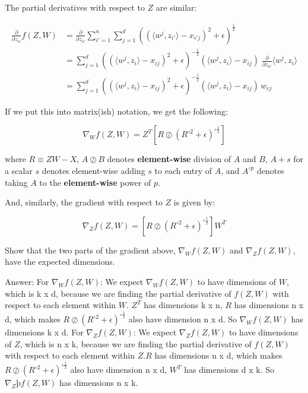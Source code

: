 \documentclass{article}
\newcommand{\blu}[1]{{\textcolor{blu}{#1}}}
\newcommand{\gre}[1]{\textcolor{gre}{#1}}
\newcommand\ans[1]{\par\gre{Answer: #1}}
\let\ask\blu
\begin{document}
The partial derivatives with respect to $Z$ are similar:

\begin{align*}
\frac{\partial}{\partial z_{ic}} f(Z,W)
  &= \frac{\partial}{\partial z_{ic}} \sum_{i'=1}^n \sum_{j=1}^d  \left( (\langle w^j, z_{i'}\rangle - x_{i'j})^2 + \epsilon \right)^{\frac12}\\
  &= \sum_{j=1}^d  \left( (\langle w^j, z_{i}\rangle - x_{ij})^2 + \epsilon \right)^{-\frac12}   (\langle w^j, z_{i}\rangle - x_{ij}) \; \frac{\partial}{\partial z_{ic}} \langle w^j, z_i\rangle \\
  &= \sum_{j=1}^d  \left( (\langle w^j, z_i\rangle - x_{ij})^2 + \epsilon \right)^{-\frac12}  (\langle w^j, z_i\rangle - x_{ij}) \, w_{cj}
\end{align*}

If we put this into matrix(ish) notation, we get the following:

\[
\nabla_W f(Z,W) = Z^T \left[ R \oslash \left(R^{\circ 2} + \epsilon\right)^{\circ \frac12}  \right]
\]

where $R\equiv ZW-X$,
$A \oslash B$ denotes \textbf{element-wise} division of $A$ and $B$,
$A + s$ for a scalar $s$ denotes element-wise adding $s$ to each entry of $A$,
and $A^{\circ p}$ denotes taking $A$ to the \textbf{element-wise} power of $p$.

And, similarly, the gradient with respect to $Z$ is given by:

\[
\nabla_Z f(Z,W) = \left[ R \oslash \left(R^{\circ 2} + \epsilon\right)^{\circ \frac12} \right] W^T
\]

\ask{Show that the two parts of the gradient above, $\nabla_W f(Z,W)$ and $\nabla_Z f(Z,W)$, have the expected dimensions.}

\ans{\newline\newline
For $\nabla_W f(Z,W)$:\newline\newline
We expect $\nabla_W f(Z,W)$ to have dimensions of $W$, which is k x d, because we are finding the partial derivative of $f(Z,W)$ with respect to each element within $W$. $Z^T$ has dimensions k x n, $R$ has dimensions n x d, which makes $R \oslash \left(R^{\circ 2} + \epsilon\right)^{\circ \frac12}$ also have dimension n x d. So $\nabla_W f(Z,W)$ has dimensions k x d. 
\newline 
\newline
For $\nabla_Z f(Z,W)$: \newline
\newline
We expect $\nabla_Z f(Z,W)$ to have dimensions of $Z$, which is n x k, because we are finding the partial derivative of $f(Z,W)$ with respect to each element within $Z$.$R$ has dimensions n x d, which makes $R \oslash \left(R^{\circ 2} + \epsilon\right)^{\circ \frac12}$ also have dimension n x d,
$W^T$ has dimensions d x k. So $\nabla_Zþ f(Z,W)$ has dimensions n x k. 
}
\newpage
\end{document}

